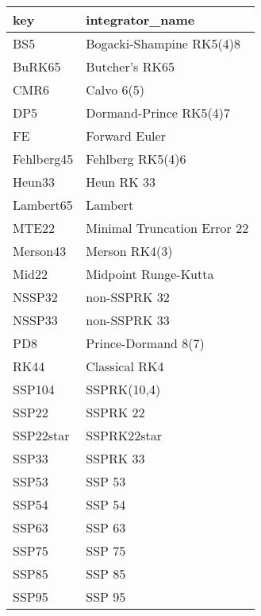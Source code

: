 \begin{tabular}{ll}
\hline
 key        & integrator\_name             \\
\hline
 BS5        & Bogacki-Shampine RK5(4)8    \\
 BuRK65     & Butcher's RK65              \\
 CMR6       & Calvo 6(5)                  \\
 DP5        & Dormand-Prince RK5(4)7      \\
 FE         & Forward Euler               \\
 Fehlberg45 & Fehlberg RK5(4)6            \\
 Heun33     & Heun RK 33                  \\
 Lambert65  & Lambert                     \\
 MTE22      & Minimal Truncation Error 22 \\
 Merson43   & Merson RK4(3)               \\
 Mid22      & Midpoint Runge-Kutta        \\
 NSSP32     & non-SSPRK 32                \\
 NSSP33     & non-SSPRK 33                \\
 PD8        & Prince-Dormand 8(7)         \\
 RK44       & Classical RK4               \\
 SSP104     & SSPRK(10,4)                 \\
 SSP22      & SSPRK 22                    \\
 SSP22star  & SSPRK22star                 \\
 SSP33      & SSPRK 33                    \\
 SSP53      & SSP 53                      \\
 SSP54      & SSP 54                      \\
 SSP63      & SSP 63                      \\
 SSP75      & SSP 75                      \\
 SSP85      & SSP 85                      \\
 SSP95      & SSP 95                      \\
\hline
\end{tabular}